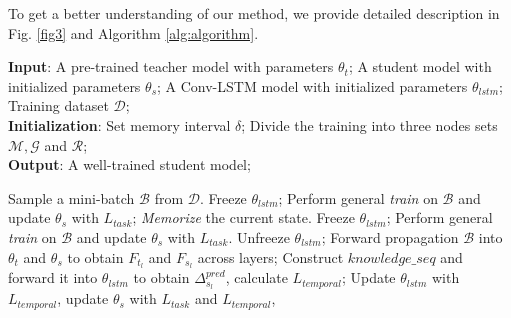 \documentclass[letterpaper]{article} %
\begin{document}
To get a better understanding of our method, we provide detailed description in Fig. \ref{fig3} and Algorithm \ref{alg:algorithm}.
\begin{algorithm}[htpb]\small
\caption{Temporal Supervised Knowledge Distillation}
\label{alg:algorithm}
\textbf{Input}: A pre-trained teacher model with parameters $\theta_{t}$; A student model with initialized parameters $\theta_{s}$; A Conv-LSTM model with initialized parameters $\theta_{lstm}$; Training dataset $\mathcal{D}$;\\
\textbf{Initialization}: Set memory interval $\delta$; Divide the training into three nodes sets $\mathcal{M},\mathcal{G}$ and $\mathcal{R}$; \\
\textbf{Output}: A well-trained student model;

\begin{algorithmic}[1] %
\STATE Sample a mini-batch $\mathcal{B}$ from $\mathcal{D}$.
\STATE Freeze $\theta_{lstm}$;
\STATE Perform general \emph{train} on $\mathcal{B}$ and update $\theta_{s}$ with $L_{task}$;
\STATE \emph{Memorize} the current state.
\STATE Freeze $\theta_{lstm}$;
\STATE Perform general \emph{train} on $\mathcal{B}$ and update $\theta_{s}$ with $L_{task}$.
\STATE Unfreeze $\theta_{lstm}$;
\STATE Forward propagation $\mathcal{B}$ into $\theta_{t}$ and $\theta_{s}$ to obtain $F_{t_{l}}$ and $F_{s_{l}}$ across layers;
\STATE Construct $knowledge\_seq$ and forward it into $\theta_{lstm}$ to obtain $\Delta^{pred}_{s_{l}}$, calculate $L_{temporal}$;
\STATE Update $\theta_{lstm}$ with $L_{temporal}$, update $\theta_{s}$ with $L_{task}$ and $L_{temporal}$, 
\ENDIF
\ENDWHILE
\end{algorithmic}
\end{algorithm}
\end{document}
